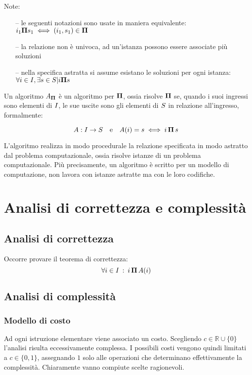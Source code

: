 Note:
\begin{itemize}[noitemsep,parsep=0pt,partopsep=0pt]
    \item[--] le seguenti notazioni sono usate in maniera equivalente: $i_1 \bm{\Pi}{} s_1 \iff (i_1 , s_1 ) \in \bm{\Pi}{}$
    \item[--] la relazione non è univoca, ad un'istanza possono essere associate più soluzioni
    \item[--] nella specifica astratta si assume esistano le soluzioni per ogni istanza: $\forall i \in I{},\exists s \in S{} | i \bm{\Pi}{} s$
\end{itemize}

Un algoritmo $A_{\bm{\Pi}{}}$ è un algoritmo per $\bm{\Pi}{}$, ossia risolve $\bm{\Pi}{}$ se, quando i suoi ingressi sono elementi di $I{}$, le sue uscite sono gli elementi di $S{}$ in relazione all'ingresso, formalmente:

$$ A: I{} \to S{} \quad \textrm{e} \quad A(i)=s \iff i \, \bm{\Pi}{} \, s $$

L'algoritmo realizza in modo procedurale la relazione specificata in modo astratto dal problema computazionale, ossia risolve istanze di un problema computazionale. Più precisamente, un algoritmo è scritto per un modello di computazione, non lavora con istanze astratte ma con le loro codifiche.

\section{Analisi di correttezza e complessità}

\subsection{Analisi di correttezza}

Occorre provare il teorema di correttezza:
$$ \forall i \in I{} \: : \: i \, \bm{\Pi}{} \, A(i) $$

\subsection{Analisi di complessità}

\subsubsection{Modello di costo}
Ad ogni istruzione elementare viene associato un costo. Scegliendo $c \in \mathbb{R} \cup \{ 0 \} $ l'analisi risulta eccessivamente complessa. I possibili costi vengono quindi limitati a $c \in \{ 0,1 \} $, assegnando $1$ solo alle operazioni che determinano effettivamente la complessità. Chiaramente vanno compiute scelte ragionevoli.

